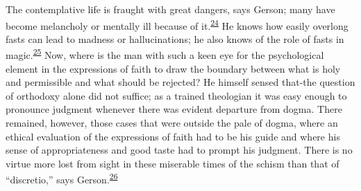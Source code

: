 The contemplative life is fraught with great dangers, says Gerson; many
have become melancholy or mentally ill because of
it.\textsuperscript{\protect\hypertarget{15_Chapter_Eight__RELIGIOUS_EXCITAT.xhtmlux5cux23id_859}{\protect\hyperlink{23_NOTES.xhtmlux5cux23id_860}{24}}}
He knows how easily overlong fasts can lead to madness or
hallucinations; he also knows of the role of fasts in
magic.\textsuperscript{\protect\hypertarget{15_Chapter_Eight__RELIGIOUS_EXCITAT.xhtmlux5cux23id_857}{\protect\hyperlink{23_NOTES.xhtmlux5cux23id_858}{25}}}
Now, where is the man with such a keen eye for the psychological element
in the expressions of faith to draw the boundary between what is holy
and permissible and what should be rejected? He himself sensed that-the
question of orthodoxy alone did not suffice; as a trained theologian it
was easy enough to pronounce judgment whenever there was evident
departure from dogma. There remained, however, those cases that were
outside the pale of dogma, where an ethical evaluation of the
expressions of faith had to be his guide and where his sense of
appropriateness and good taste had to prompt his judgment. There is no
virtue more lost from sight in these miserable times of the schism than
that of ``discretio,'' says
Gerson.\textsuperscript{\protect\hypertarget{15_Chapter_Eight__RELIGIOUS_EXCITAT.xhtmlux5cux23id_855}{\protect\hyperlink{23_NOTES.xhtmlux5cux23id_856}{26}}}

